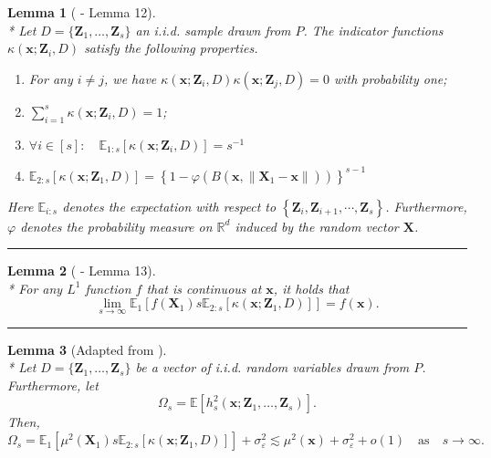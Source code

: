 \documentclass[letterpaper,10pt]{article}
\numberwithin{equation}{section}
\numberwithin{thm}{section}
\newtheorem{lem}{Lemma}
\numberwithin{lem}{section}
\numberwithin{cor}{section}
\newcommand{\E}{\mathbb{E}}
\newcommand{\1}{\mathbbm{1}}
\begin{document}
\begin{lem}[\citet{demirkaya_optimal_2024} - Lemma 12]\label{lem_dem12}\mbox{}\\*
	Let $D = \{\mathbf{Z}_1, \dotsc, \mathbf{Z}_s\}$ an i.i.d. sample drawn from $P$.
	The indicator functions $\kappa\left(\mathbf{x}; \mathbf{Z}_i, D\right)$ satisfy the following properties.
	\begin{enumerate}
		\item For any $i \neq j$, we have $\kappa\left(\mathbf{x}; \mathbf{Z}_i, D\right) \kappa\left(\mathbf{x}; \mathbf{Z}_j, D\right)=0$ with probability one;
		\item $\sum_{i=1}^{s} \kappa\left(\mathbf{x}; \mathbf{Z}_i, D\right)=1$;
		\item $\forall i \in [s]: \quad \mathbb{E}_{1:s}\left[\kappa\left(\mathbf{x}; \mathbf{Z}_i, D\right)\right]=s^{-1}$
		\item $\mathbb{E}_{2: s}\left[\kappa\left(\mathbf{x}; \mathbf{Z}_1, D\right)\right]=\left\{1-\varphi\left(B\left(\mathbf{x},\left\|\mathbf{X}_1-\mathbf{x}\right\|\right)\right)\right\}^{s-1}$
	\end{enumerate}
	Here $\mathbb{E}_{i: s}$ denotes the expectation with respect to $\left\{\mathbf{Z}_i, \mathbf{Z}_{i+1}, \cdots, \mathbf{Z}_s\right\}$.
	Furthermore, $\varphi$ denotes the probability measure on $\mathbb{R}^{d}$ induced by the random vector $\mathbf{X}$.
\end{lem}

\hrule

\begin{lem}[\citet{demirkaya_optimal_2024} - Lemma 13]\label{lem_dem13}\mbox{}\\*
	For any $L^1$ function $f$ that is continuous at $\mathbf{x}$, it holds that
	\begin{equation}
		\lim _{s \rightarrow \infty} \E_1\left[f\left(\mathbf{X}_1\right) s \E_{2: s}\left[\kappa(\mathbf{x}; \mathbf{Z}_1, D)\right]\right]
		= f(\mathbf{x}).
	\end{equation}
\end{lem}

\hrule

\begin{lem}[Adapted from \citet{demirkaya_optimal_2024}]\label{lem_omega_s}\mbox{}\\*
	Let $D = \{\mathbf{Z}_1, \dotsc, \mathbf{Z}_{s}\}$ be a vector of i.i.d. random variables drawn from $P$.
	Furthermore, let
	\begin{equation}
		\Omega_{s}
		= \E\left[h_{s}^{2}\left(\mathbf{x}; \mathbf{Z}_1, \ldots,  \mathbf{Z}_{s}\right)\right].
	\end{equation}
	Then,
	\begin{equation}
		\Omega_{s}
		= \E_1\left[\mu^2\left(\mathbf{X}_1\right) s \E_{2:s}\left[\kappa\left(\mathbf{x}; \mathbf{Z}_1, D\right)\right]\right] + \sigma_{\varepsilon}^2
		\lesssim \mu^2(\mathbf{x}) + \sigma_{\varepsilon}^2 + o(1)
		\quad \text{as} \quad s \rightarrow \infty.
	\end{equation}
\end{lem}
\end{document}
